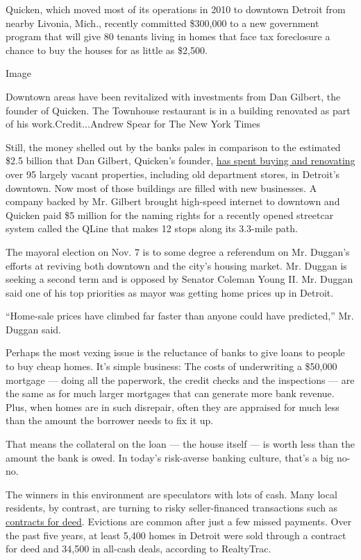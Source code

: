 Quicken, which moved most of its operations in 2010 to downtown Detroit
from nearby Livonia, Mich., recently committed \$300,000 to a new
government program that will give 80 tenants living in homes that face
tax foreclosure a chance to buy the houses for as little as \$2,500.

Image

Downtown areas have been revitalized with investments from Dan Gilbert,
the founder of Quicken. The Townhouse restaurant is in a building
renovated as part of his work.Credit...Andrew Spear for The New York
Times

Still, the money shelled out by the banks pales in comparison to the
estimated \$2.5 billion that Dan Gilbert, Quicken's founder,
\href{https://www.nytimes.com/2017/01/21/business/dealbook/quicken-loans-dan-gilbert-mortgage-lender.html}{has
spent buying and renovating} over 95 largely vacant properties,
including old department stores, in Detroit's downtown. Now most of
those buildings are filled with new businesses. A company backed by Mr.
Gilbert brought high-speed internet to downtown and Quicken paid \$5
million for the naming rights for a recently opened streetcar system
called the QLine that makes 12 stops along its 3.3-mile path.

The mayoral election on Nov. 7 is to some degree a referendum on Mr.
Duggan's efforts at reviving both downtown and the city's housing
market. Mr. Duggan is seeking a second term and is opposed by Senator
Coleman Young II. Mr. Duggan said one of his top priorities as mayor was
getting home prices up in Detroit.

``Home-sale prices have climbed far faster than anyone could have
predicted,'' Mr. Duggan said.

Perhaps the most vexing issue is the reluctance of banks to give loans
to people to buy cheap homes. It's simple business: The costs of
underwriting a \$50,000 mortgage --- doing all the paperwork, the credit
checks and the inspections --- are the same as for much larger mortgages
that can generate more bank revenue. Plus, when homes are in such
disrepair, often they are appraised for much less than the amount the
borrower needs to fix it up.

That means the collateral on the loan --- the house itself --- is worth
less than the amount the bank is owed. In today's risk-averse banking
culture, that's a big no-no.

The winners in this environment are speculators with lots of cash. Many
local residents, by contrast, are turning to risky seller-financed
transactions such as
\href{https://www.nytimes.com/2016/02/21/business/dealbook/market-for-fixer-uppers-traps-low-income-buyers.html}{contracts
for deed}. Evictions are common after just a few missed payments. Over
the past five years, at least 5,400 homes in Detroit were sold through a
contract for deed and 34,500 in all-cash deals, according to RealtyTrac.

